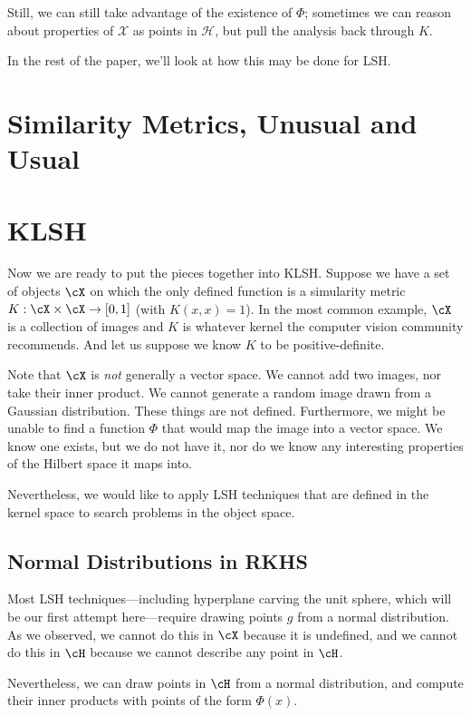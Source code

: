 \documentclass[twoside,11pt]{homework}
\begin{document}
\begin{multicols}{2}
Still, we can still take advantage of the existence of $\Phi$; sometimes we can reason about properties of $\mathcal{X}$ as points in $\mathcal{H}$, but pull the analysis back through $K$.

In the rest of the paper, we'll look at how this may be done for LSH.
\section{Similarity Metrics, Unusual and Usual} %
  
\section{KLSH}

Now we are ready to put the pieces together into KLSH.  Suppose we
have a set of objects $\cX$ on which the only defined function is a
simularity metric $K:\cX \times \cX \rightarrow [0,1]$ (with
$K(x,x)=1$).  In the most
common example, $\cX$ is a collection of images and $K$ is whatever kernel the computer
vision community recommends.  And let us suppose we know $K$ to be
positive-definite.

Note that $\cX$ is \emph{not} generally a vector space.  We cannot add two
images, nor take their inner product.  We cannot generate a random
image drawn from a Gaussian distribution.  These things are not
defined.  Furthermore, we might be unable to find a function $\Phi$ that would map
the image into a vector space.  We know one exists, but we do not have
it, nor do we know any interesting properties of the Hilbert space it
maps into.

Nevertheless, we would like to apply LSH techniques that are defined
in the kernel space to search problems in the object space.
  
\subsection{Normal Distributions in RKHS} %

Most LSH techniques---including hyperplane carving the unit sphere,
which will be our first attempt here---require drawing points $g$ from a
normal distribution.  As we observed, we cannot do this in $\cX$
because it is undefined, and we cannot do this in $\cH$ because we
cannot describe any point in $\cH$.

Nevertheless, we can draw points in $\cH$ from a normal distribution,
and compute their inner products with points of the form $\Phi(x)$.


\end{multicols}
\end{document}
